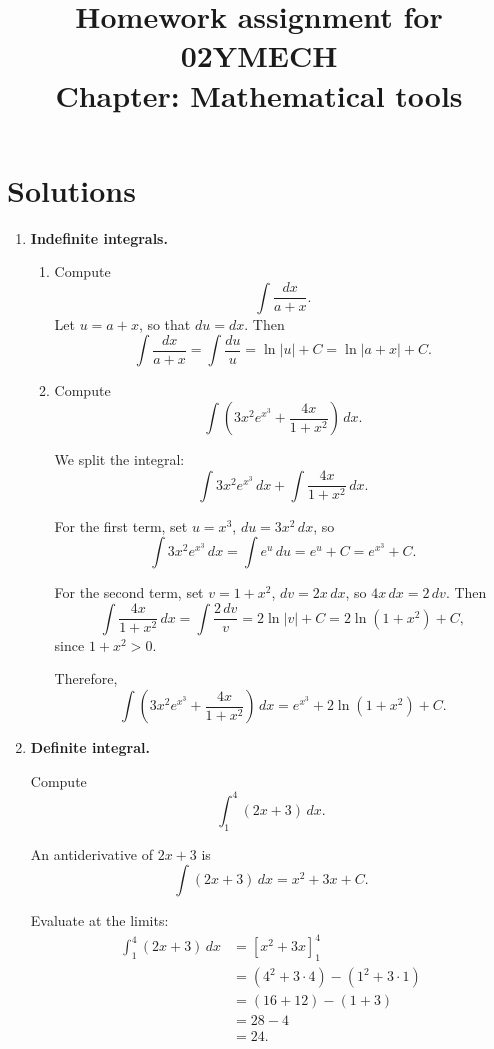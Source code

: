 \documentclass[12pt]{article}
\title{Homework assignment for 02YMECH \\ Chapter: Mathematical tools}
\date{}
\begin{document}
\maketitle

\vspace*{-2cm}

\section*{Solutions}

\begin{enumerate}

\item \textbf{Indefinite integrals.}

\begin{enumerate}
    \item Compute
    \[
      \int \frac{dx}{a+x}.
    \]
    Let $u = a+x$, so that $du = dx$. Then
    \[
      \int \frac{dx}{a+x}
      = \int \frac{du}{u}
      = \ln|u| + C
      = \ln|a+x| + C.
    \]

    \item Compute
    \[
      \int \left(3x^2 e^{x^3} + \frac{4x}{1+x^2}\right) \, dx.
    \]

    We split the integral:
    \[
      \int 3x^2 e^{x^3} \, dx + \int \frac{4x}{1+x^2} \, dx.
    \]

    For the first term, set $u = x^3$, $du = 3x^2 \, dx$, so
    \[
      \int 3x^2 e^{x^3} \, dx = \int e^u \, du = e^u + C = e^{x^3} + C.
    \]

    For the second term, set $v = 1+x^2$, $dv = 2x \, dx$, so $4x \, dx = 2\, dv$. Then
    \[
      \int \frac{4x}{1+x^2} \, dx
      = \int \frac{2\, dv}{v}
      = 2 \ln|v| + C
      = 2 \ln(1+x^2) + C,
    \]
    since $1+x^2>0$.

    Therefore,
    \[
      \int \left(3x^2 e^{x^3} + \frac{4x}{1+x^2}\right) \, dx
      = e^{x^3} + 2 \ln(1+x^2) + C.
    \]

\end{enumerate}


\item \textbf{Definite integral.}

Compute
\[
  \int_{1}^{4} (2x+3)\,dx.
\]

An antiderivative of $2x+3$ is
\[
  \int (2x+3)\,dx = x^2 + 3x + C.
\]

Evaluate at the limits:
\begin{align*}
\int_{1}^{4} (2x+3)\,dx
&= \left[ x^2 + 3x \right]_{1}^{4} \\
&= \left(4^2 + 3\cdot 4\right) - \left(1^2 + 3\cdot 1\right) \\
&= (16+12) - (1+3) \\
&= 28 - 4 \\
&= 24.
\end{align*}


\end{enumerate}
\end{document}

